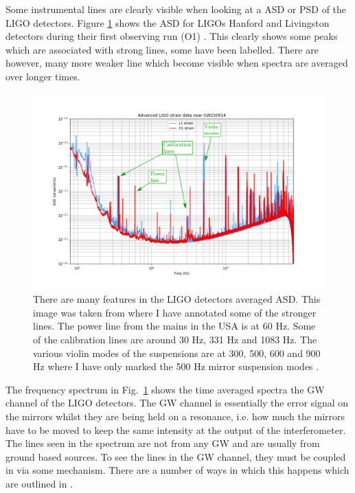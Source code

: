 Some instrumental lines are clearly visible when looking at a \gls{ASD} or \gls{PSD} of the \gls{LIGO} detectors. Figure \ref{detchar:line:psd} shows the \gls{ASD} for \glspl{LIGO} Hanford and Livingston detectors during their first observing run (O1) \citep{GWOpen}. This clearly shows some peaks which are associated with strong lines, some have been labelled. There are however, many more weaker line which become visible when spectra are averaged over longer times.
%
\begin{figure}
    \centering
    \includegraphics[width=\textwidth]{C5_detchar/ligo_o1_asd_annot.pdf}
    \caption[Strain \gls{ASD} for the \gls{LIGO} detectors.]{There are many features in the \gls{LIGO} detectors averaged \gls{ASD}. This image was taken from \citep{GWOpen} where I have annotated some of the stronger lines. The power line from the mains in the USA is at 60 Hz. Some of the calibration lines are around 30 Hz, 331 Hz and 1083 Hz. The various violin modes of the suspensions are at 300, 500, 600 and 900 Hz where I have only marked the 500 Hz mirror suspension modes \citep{GWOpen}.}
    \label{detchar:line:psd}
\end{figure}
%
The frequency spectrum in Fig.~\ref{detchar:line:psd} shows the time averaged spectra the \gls{GW} channel of the \gls{LIGO} detectors. 
The \gls{GW} channel is essentially the error signal on the mirrors whilst they are being held on a resonance, i.e. how much the mirrors have to be moved to keep the same intensity at the output of the interferometer.
The lines seen in the spectrum are not from any \gls{GW} and are usually from ground based sources.
To see the lines in the \gls{GW} channel, they must be coupled in via some mechanism. 
There are a number of ways in which this happens which are outlined in \citep{covas2018IdentificationMitigation}.
